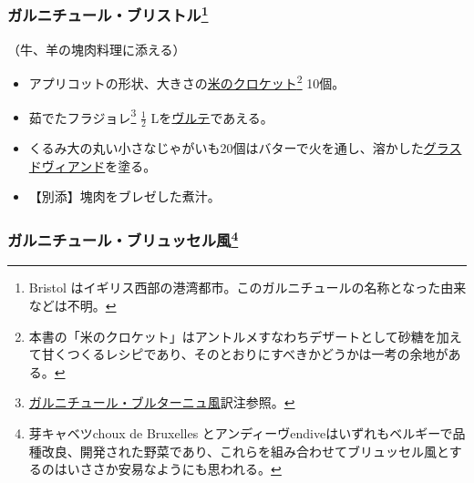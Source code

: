 \begin{recette}
\atoaki{}

\hypertarget{garniture-bristol}{%
\subsubsection[ガルニチュール・ブリストル]{\texorpdfstring{ガルニチュール・ブリストル\footnote{Bristol
  はイギリス西部の港湾都市。このガルニチュールの名称となった由来などは不明。}}{ガルニチュール・ブリストル}}\label{garniture-bristol}}



（牛、羊の塊肉料理に添える）

\begin{itemize}
\item
  アプリコットの形状、大きさの\protect\hyperlink{croquettes-de-riz}{米のクロケット}\footnote{本書の「米のクロケット」はアントルメすなわちデザートとして砂糖を加えて甘くつくるレシピであり、そのとおりにすべきかどうかは一考の余地がある。}
  10個。
\item
  茹でたフラジョレ\footnote{\protect\hyperlink{garniture-bretonne}{ガルニチュール・ブルターニュ風}訳注参照。}
  \(\frac{1}{2}\) Lを\protect\hyperlink{veloute}{ヴルテ}であえる。
\item
  くるみ大の丸い小さなじゃがいも20個はバターで火を通し、溶かした\protect\hyperlink{glace-de-viande}{グラスドヴィアンド}を塗る。
\item
  【別添】塊肉をブレゼした煮汁。
\end{itemize}

\atoaki{}

\hypertarget{garniture-bluxelloise}{%
\subsubsection[ガルニチュール・ブリュッセル風]{\texorpdfstring{ガルニチュール・ブリュッセル風\footnote{芽キャベツchoux
  de Bruxelles
  とアンディーヴendiveはいずれもベルギーで品種改良、開発された野菜であり、これらを組み合わせてブリュッセル風とするのはいささか安易なようにも思われる。}}{ガルニチュール・ブリュッセル風}}\label{garniture-bluxelloise}}




\end{recette}
